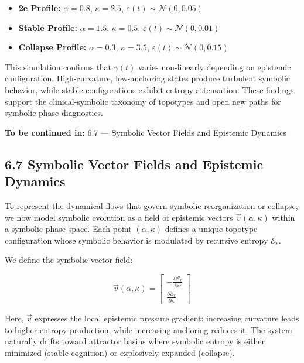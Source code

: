 \begin{itemize}
    \item \textbf{2e Profile:} $\alpha = 0.8$, $\kappa = 2.5$, $\varepsilon(t) \sim \mathcal{N}(0, 0.05)$
    \item \textbf{Stable Profile:} $\alpha = 1.5$, $\kappa = 0.5$, $\varepsilon(t) \sim \mathcal{N}(0, 0.01)$
    \item \textbf{Collapse Profile:} $\alpha = 0.3$, $\kappa = 3.5$, $\varepsilon(t) \sim \mathcal{N}(0, 0.15)$
\end{itemize}

This simulation confirms that $\gamma(t)$ varies non-linearly depending on epistemic configuration. High-curvature, low-anchoring states produce turbulent symbolic behavior, while stable configurations exhibit entropy attenuation. These findings support the clinical-symbolic taxonomy of topotypes and open new paths for symbolic phase diagnostics.

\bigskip
\noindent
\textbf{To be continued in:} 6.7 — Symbolic Vector Fields and Epistemic Dynamics


\subsection*{6.7 Symbolic Vector Fields and Epistemic Dynamics}

To represent the dynamical flows that govern symbolic reorganization or collapse, we now model symbolic evolution as a field of epistemic vectors $\vec{v}(\alpha, \kappa)$ within a symbolic phase space. Each point $(\alpha, \kappa)$ defines a unique topotype configuration whose symbolic behavior is modulated by recursive entropy $\mathcal{E}_r$.

We define the symbolic vector field:

\[
\vec{v}(\alpha, \kappa) = 
\begin{bmatrix}
-\frac{\partial \mathcal{E}_r}{\partial \alpha} \\
\frac{\partial \mathcal{E}_r}{\partial \kappa}
\end{bmatrix}
\]

Here, $\vec{v}$ expresses the local epistemic pressure gradient: increasing curvature leads to higher entropy production, while increasing anchoring reduces it. The system naturally drifts toward attractor basins where symbolic entropy is either minimized (stable cognition) or explosively expanded (collapse).

